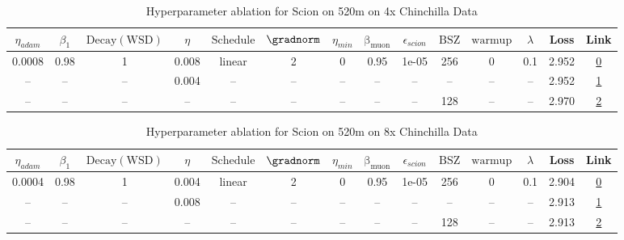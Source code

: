 \begin{table}[H]
\centering
\caption{Hyperparameter ablation for Scion on 520m on 4x Chinchilla Data}
\label{tab:ablation_scion_520m_on_4x_chinchilla_data}
\begin{tabular}{cccccccccccccc}
\toprule
$\eta_{adam}$ & $\beta_1$ & $\mathrm{Decay (WSD)}$ & $\eta$ & $\mathrm{Schedule}$ & $\gradnorm$ & $\eta_{min}$ & $\mathrm{\beta_{muon}}$ & $\epsilon_{scion}$ & $\mathrm{BSZ}$ & $\mathrm{warmup}$ & $\lambda$ & Loss & Link \\
\midrule
0.0008 & 0.98 & 1 & 0.008 & linear & 2 & 0 & 0.95 & 1e-05 & 256 & 0 & 0.1 & 2.952 & \href{https://wandb.ai/stanford-mercury/optimizer-scaling/runs/sweep-520m-42B-scion941d43lr0.008-wd0.1-minlr0-warmup0-b10.98-gn-ab5aa7}{0} \\
\midrule
-- & -- & -- & 0.004 & -- & -- & -- & -- & -- & -- & -- & -- & 2.952 & \href{https://wandb.ai/stanford-mercury/optimizer-scaling/runs/sweep-520m-42B-scion268e92lr0.004-wd0.1-minlr0-warmup0-b10.98-gn-26c45d}{1} \\
-- & -- & -- & -- & -- & -- & -- & -- & -- & 128 & -- & -- & 2.970 & \href{https://wandb.ai/stanford-mercury/optimizer-scaling/runs/sweep-520m-42B-scion32fc90lr0.008-wd0.1-minlr0-warmup0-b10.98-gn-202a50}{2} \\
\bottomrule
\end{tabular}
\end{table}

\begin{table}[H]
\centering
\caption{Hyperparameter ablation for Scion on 520m on 8x Chinchilla Data}
\label{tab:ablation_scion_520m_on_8x_chinchilla_data}
\begin{tabular}{cccccccccccccc}
\toprule
$\eta_{adam}$ & $\beta_1$ & $\mathrm{Decay (WSD)}$ & $\eta$ & $\mathrm{Schedule}$ & $\gradnorm$ & $\eta_{min}$ & $\mathrm{\beta_{muon}}$ & $\epsilon_{scion}$ & $\mathrm{BSZ}$ & $\mathrm{warmup}$ & $\lambda$ & Loss & Link \\
\midrule
0.0004 & 0.98 & 1 & 0.004 & linear & 2 & 0 & 0.95 & 1e-05 & 256 & 0 & 0.1 & 2.904 & \href{https://wandb.ai/stanford-mercury/optimizer-scaling/runs/sweep-520m-85B-scionbe58eblr0.004-wd0.1-minlr0-warmup0-b10.98-gn-7658bc}{0} \\
\midrule
-- & -- & -- & 0.008 & -- & -- & -- & -- & -- & -- & -- & -- & 2.913 & \href{https://wandb.ai/stanford-mercury/optimizer-scaling/runs/sweep-520m-85B-scion32fc90lr0.008-wd0.1-minlr0-warmup0-b10.98-gn-2fad85}{1} \\
-- & -- & -- & -- & -- & -- & -- & -- & -- & 128 & -- & -- & 2.913 & \href{https://wandb.ai/stanford-mercury/optimizer-scaling/runs/sweep-520m-85B-scion6cf4fblr0.004-wd0.1-minlr0-warmup0-b10.98-gn-ec60f2}{2} \\
\bottomrule
\end{tabular}
\end{table}

